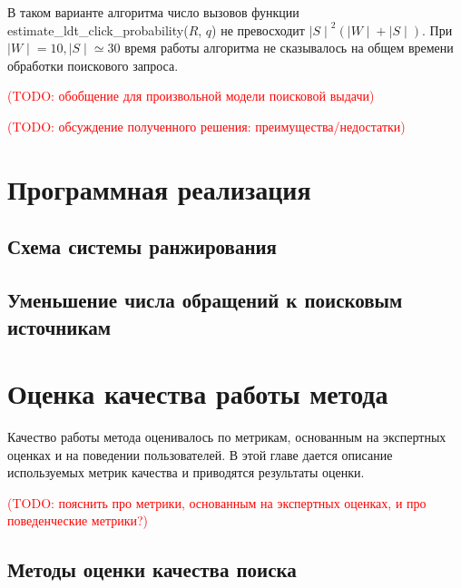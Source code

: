 \documentclass[12pt,a4paper]{report}
\newcommand\note[1]{\textcolor{red}{(#1)}}
\newcommand\todonote[1]{\note{TODO: #1}}
\newcommand*\card[1]{{\mid #1 \mid}}
\begin{document}
В таком варианте алгоритма число вызовов функции \linebreak \textrm{estimate\_ldt\_click\_probability($R$, $q$)} не превосходит $\card{S}^2 (\card{W} + \card{S})$. При $\card{W} = 10, \card{S} \simeq 30$ время работы алгоритма не сказывалось на общем времени обработки поискового запроса.

\todonote{обобщение для произвольной модели поисковой выдачи}

\todonote{обсуждение полученного решения: преимущества/недостатки}


\chapter{Программная реализация}

\section{Схема системы ранжирования}


\section{Уменьшение числа обращений к поисковым источникам}

\chapter{Оценка качества работы метода}

Качество работы метода оценивалось по метрикам, основанным на экспертных оценках и на поведении пользователей. В этой главе дается описание используемых метрик качества и приводятся результаты оценки.

\todonote{пояснить про метрики, основанным на экспертных оценках, и про поведенческие метрики?}

\section{Методы оценки качества поиска}
\end{document}
